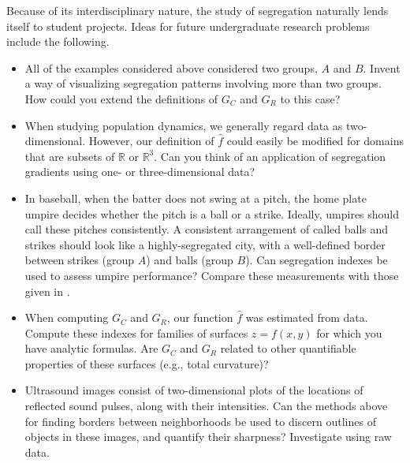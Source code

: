 \documentclass{article}
\theoremstyle{theorem}
\theoremstyle{definition}
\begin{document}
Because of its interdisciplinary nature, the study of segregation naturally lends itself to student projects. Ideas for future undergraduate research problems include the following.

\begin{itemize}
  \item All of the examples considered above considered two groups, $A$ and $B$. Invent a way of visualizing segregation patterns involving more than two groups. How could you extend the definitions of $G_C$ and $G_R$ to this case?
  \item When studying population dynamics, we generally regard data as two-dimensional. However, our definition of $\hat{f}$ could easily be modified for domains that are subsets of $\mathbb{R}$ or $\mathbb{R}^3$.  Can you think of an application of segregation gradients using one- or three-dimensional data?
  \item In baseball, when the batter does not swing at a pitch, the home plate umpire decides whether the pitch is a ball or a strike. Ideally, umpires should call these pitches consistently. A consistent arrangement of called balls and strikes should look like a highly-segregated city, with a well-defined border between strikes (group $A$) and balls (group $B$). Can segregation indexes be used to assess umpire performance? Compare these measurements with those given in \cite{hunter18}.
  \item When computing $G_C$ and $G_R$, our function $\hat{f}$ was estimated from data. Compute these indexes for families of surfaces $z = f(x,y)$ for which you have analytic formulas. Are $G_C$ and $G_R$ related to other quantifiable properties of these surfaces (e.g., total curvature)?
  \item Ultrasound images consist of two-dimensional plots of the locations of reflected sound pulses, along with their intensities. Can the methods above for finding borders between neighborhoods be used to discern outlines of objects in these images, and quantify their sharpness? Investigate using raw data.
\end{itemize}
\end{document}
